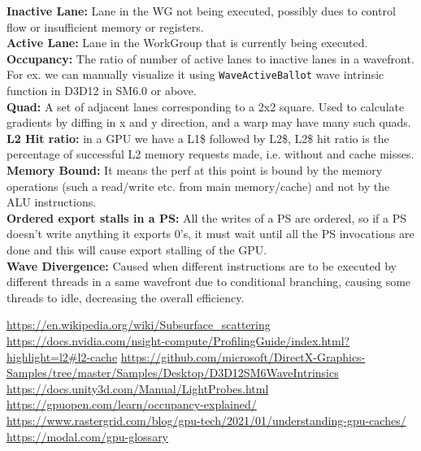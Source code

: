 \documentclass[14pt]{article}
\begin{document}
\textbf{Inactive Lane:} Lane in the WG not being executed, possibly dues to control flow or insufficient memory or registers.\cite{wave} \\

\textbf{Active Lane:} Lane in the WorkGroup that is currently being executed.\cite{wave} \\

\textbf{Occupancy:} The ratio of number of active lanes to inactive lanes in a wavefront. For ex. we can manually visualize it using \lstinline|WaveActiveBallot| wave intrinsic function in D3D12 in SM6.0 or above. \\

\textbf{Quad:} A set of adjacent lanes corresponding to a 2x2 square. Used to calculate gradients by diffing in x and y direction, and a warp may have many such quads. \\

\textbf{L2 Hit ratio:} in a GPU we have a L1\$ followed by L2\$, \cite{l2} L2\$ hit ratio is the percentage of successful L2 memory requests made, i.e. without and cache misses. \\

\textbf{Memory Bound:} It means the perf at this point is bound by the memory operations (such a read/write etc. from main memory/cache) and not by the ALU instructions. \\

\textbf{Ordered export stalls in a PS:} All the writes of a PS are ordered, so if a PS doesn't write anything it exports 0's, it must wait until all the PS invocations are done and this will cause export stalling of the GPU. \\

\textbf{Wave Divergence:} Caused when different instructions are to be executed by different threads in a same wavefront due to conditional branching, causing some threads to idle, decreasing the overall efficiency.


\begin{thebibliography}{2}

	 \url{https://en.wikipedia.org/wiki/Subsurface_scattering}
	 \url{https://docs.nvidia.com/nsight-compute/ProfilingGuide/index.html?highlight=l2#l2-cache}
	 \url{https://github.com/microsoft/DirectX-Graphics-Samples/tree/master/Samples/Desktop/D3D12SM6WaveIntrinsics}
	 \url{https://docs.unity3d.com/Manual/LightProbes.html}
	 \url{https://gpuopen.com/learn/occupancy-explained/}
	 \url{https://www.rastergrid.com/blog/gpu-tech/2021/01/understanding-gpu-caches/}
	 \url{https://modal.com/gpu-glossary}
\end{thebibliography}

\end{document}
